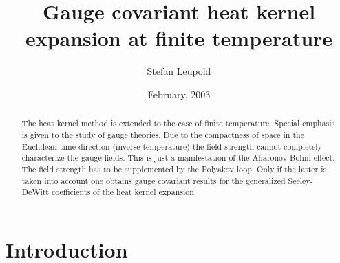 \documentclass[a4paper,showpacs,showkeys,prd,nofootinbib]{revtex4}
\begin{document}

\title{Gauge covariant heat kernel expansion at finite temperature}

\date{February, 2003}

\author{Stefan Leupold}



\begin{abstract}
The heat kernel method is extended to the case of finite temperature. Special emphasis
is given to the study of gauge theories. Due to the
compactness of space in the Euclidean time direction (inverse temperature) the field
strength cannot completely characterize the gauge fields. This is just a
manifestation of the Aharonov-Bohm effect. The field strength has to be supplemented
by the Polyakov loop. Only if the latter is taken into account one obtains gauge
covariant results for the generalized Seeley-DeWitt coefficients of the heat kernel 
expansion.
\end{abstract}

\maketitle


\section{Introduction}
\label{sec:intro}
\end{document}
